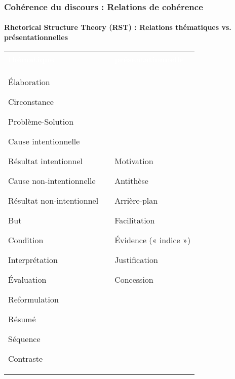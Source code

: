 \documentclass[xcolor=table]{beamer}
\begin{document}
\begin{frame}
	\frametitle{Cohérence du discours : Relations de cohérence}
	\framesubtitle{Rhetorical Structure Theory (RST) : Relations thématiques vs. présentationnelles}
	
	\footnotesize
	\begin{tabular}{p{}lp{}}
		\rowcolor{darkblue}
		\bfseries\textcolor{white}{thématique} && \bfseries\textcolor{white}{présentationnelle}\\
		
		Élaboration
		
		Circonstance
		
		Problème-Solution
		
		Cause intentionnelle
		
		Résultat intentionnel
		
		Cause non-intentionnelle
		
		Résultat non-intentionnel
		
		But
		
		Condition
		
		Interprétation
		
		Évaluation
		
		Reformulation
		
		Résumé
		
		Séquence
		
		Contraste
		
		&&
		Motivation
		
		Antithèse
		
		Arrière-plan
		
		Facilitation
		
		Évidence (« indice »)
		
		Justification
		
		Concession\\
	\end{tabular}
	
\end{frame}
\end{document}
